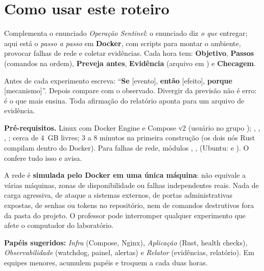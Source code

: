\section{Como usar este roteiro}

Complementa o enunciado \emph{Operação Sentinel}: o enunciado diz \emph{o que} entregar; aqui está o
\emph{passo a passo} em \textbf{Docker}, com scripts para montar o ambiente, provocar falhas de rede e coletar
evidências. Cada hora tem: \textbf{Objetivo}, \textbf{Passos} (comandos na ordem), \textbf{Preveja antes},
\textbf{Evidência} (arquivo em ) e \textbf{Checagem}.

\begin{ideia}
Antes de cada experimento escreva: ``\textbf{Se} [evento], \textbf{então} [efeito], \textbf{porque} [mecanismo]''.
Depois compare com o observado. Divergir da previsão não é erro: é o que mais ensina. Toda afirmação do
relatório aponta para um arquivo de evidência.
\end{ideia}

\textbf{Pré-requisitos.} Linux com Docker Engine e Compose v2 (usuário no grupo ); ,
, , ; cerca de 4~GB livres; 3 a 8 minutos na primeira construção (os dois nós Rust
compilam dentro do Docker). Para falhas de rede, módulos , , 
(Ubuntu:  e ).
O  confere tudo isso e avisa.

\begin{perigo}
A rede é \textbf{simulada pelo Docker em uma única máquina}: não equivale a várias máquinas, zonas de
disponibilidade ou falhas independentes reais. Nada de carga agressiva, de ataque a sistemas externos, de portas
administrativas expostas, de senhas ou tokens no repositório, nem de comandos destrutivos fora da pasta do projeto.
O professor pode interromper qualquer experimento que afete o computador do laboratório.
\end{perigo}

\textbf{Papéis sugeridos:} \emph{Infra} (Compose, Nginx), \emph{Aplicação} (Rust, health checks),
\emph{Observabilidade} (watchdog, painel, alertas) e \emph{Relator} (evidências, relatório). Em equipes menores,
acumulem papéis e troquem a cada duas horas.

